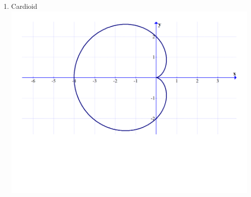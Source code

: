 \documentclass[12pt]{article}
\newif\ifans
\begin{document}
\begin{enumerate}
\item Cardioid\\
\includegraphics[scale=0.35]{graph3.pdf}

\ifans{\fbox{$r=2(1-\cos{\theta})$}} \fi

\end{enumerate}

\end{document}

